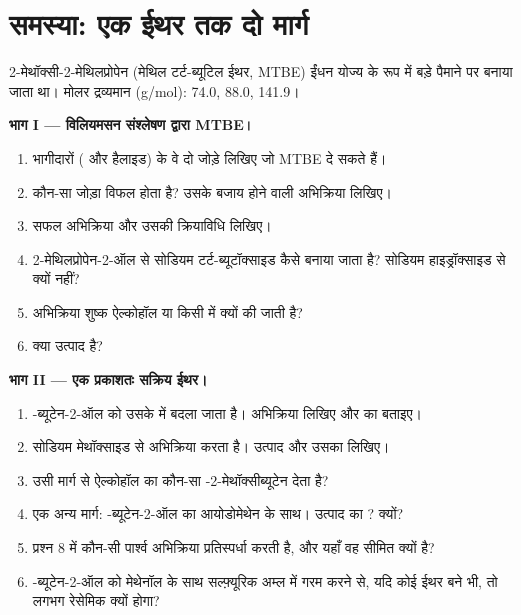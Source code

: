 \section{समस्या: एक ईथर तक दो मार्ग}

\begin{problem}
\label{pb:b1:alcohol-activation:1}
2-मेथॉक्सी-2-मेथिलप्रोपेन (मेथिल टर्ट-ब्यूटिल ईथर, MTBE) ईंधन योज्य के रूप में
बड़े पैमाने पर बनाया जाता था। मोलर द्रव्यमान (\unit{g/mol}): 
74.0,  88.0,  141.9।

\medskip
\noindent\textbf{भाग I --- विलियमसन संश्लेषण द्वारा MTBE।}
\begin{enumerate}
  \item भागीदारों ( और हैलाइड) के वे दो जोड़े लिखिए जो
        MTBE दे सकते हैं।
  \item कौन-सा जोड़ा विफल होता है? उसके बजाय होने वाली अभिक्रिया लिखिए।
  \item सफल अभिक्रिया और उसकी क्रियाविधि लिखिए।
  \item 2-मेथिलप्रोपेन-2-ऑल से सोडियम टर्ट-ब्यूटॉक्साइड कैसे बनाया जाता है?
        सोडियम हाइड्रॉक्साइड से क्यों नहीं?
  \item अभिक्रिया शुष्क ऐल्कोहॉल या किसी  में क्यों की जाती है?
  \item क्या उत्पाद  है?
\end{enumerate}

\medskip
\noindent\textbf{भाग II --- एक प्रकाशतः सक्रिय ईथर।}
\begin{enumerate}[resume]
  \item {}-ब्यूटेन-2-ऑल को उसके  में बदला जाता है। अभिक्रिया
        लिखिए और  का  बताइए।
  \item {} सोडियम मेथॉक्साइड से अभिक्रिया करता है। उत्पाद और
        उसका  लिखिए।
  \item उसी मार्ग से ऐल्कोहॉल का कौन-सा  -2-मेथॉक्सीब्यूटेन
        देता है?
  \item एक अन्य मार्ग: -ब्यूटेन-2-ऑल का 
        आयोडोमेथेन के साथ। उत्पाद का ? क्यों?
  \item प्रश्न 8 में कौन-सी पार्श्व अभिक्रिया प्रतिस्पर्धा करती है, और यहाँ वह
        सीमित क्यों है?
  \item {}-ब्यूटेन-2-ऑल को मेथेनॉल के साथ सल्फ़्यूरिक
        अम्ल में गरम करने से, यदि कोई ईथर बने भी, तो लगभग रेसेमिक क्यों होगा?
\end{enumerate}


\end{problem}
